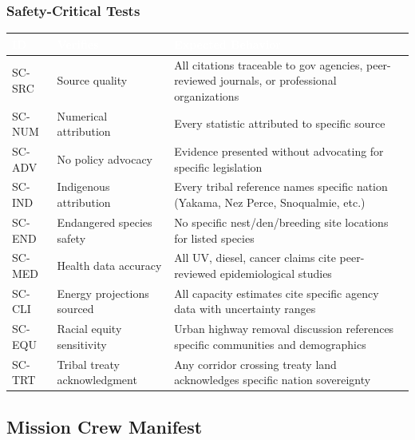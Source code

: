 \documentclass[11pt,letterpaper]{article}
\newcommand{\tableheader}[1]{\textbf{\sffamily\textcolor{white}{#1}}}
\begin{document}
\subsubsection{Safety-Critical Tests}

\begin{center}
\begin{tabularx}{\textwidth}{L{1.5cm}L{4cm}X}
\toprule
{}
\tableheader{ID} & \tableheader{Verifies} & \tableheader{Expected Behavior} \\
\midrule
SC-SRC & Source quality & All citations traceable to gov agencies, peer-reviewed journals, or professional organizations \\
SC-NUM & Numerical attribution & Every statistic attributed to specific source \\
SC-ADV & No policy advocacy & Evidence presented without advocating for specific legislation \\
SC-IND & Indigenous attribution & Every tribal reference names specific nation (Yakama, Nez Perce, Snoqualmie, etc.) \\
SC-END & Endangered species safety & No specific nest/den/breeding site locations for listed species \\
SC-MED & Health data accuracy & All UV, diesel, cancer claims cite peer-reviewed epidemiological studies \\
SC-CLI & Energy projections sourced & All capacity estimates cite specific agency data with uncertainty ranges \\
SC-EQU & Racial equity sensitivity & Urban highway removal discussion references specific communities and demographics \\
SC-TRT & Tribal treaty acknowledgment & Any corridor crossing treaty land acknowledges specific nation sovereignty \\
\bottomrule
\end{tabularx}
\end{center}

\subsection{Mission Crew Manifest}
\end{document}
